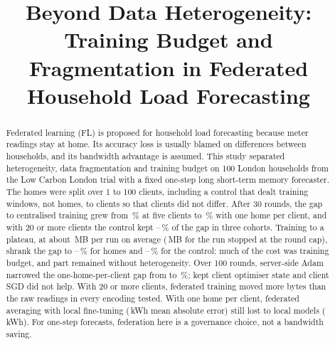 
\title{Beyond Data Heterogeneity: Training Budget and Fragmentation in Federated Household Load Forecasting}

\begin{abstract}
Federated learning (FL) is proposed for household load forecasting because meter readings stay at home. Its accuracy loss
is usually blamed on differences between households, and its bandwidth advantage is assumed. This study separated
heterogeneity, data fragmentation and training budget on 100 London households from the Low Carbon London trial with a
fixed one-step long short-term memory forecaster. The homes were split over 1 to 100 clients, including a control that
dealt training windows, not homes, to clients so that clients did not differ. After 30 rounds, the gap to centralised
training grew from \RvHomeKfiveGap{}\,\% at five clients to \RvHomeKhundredGap{}\,\% with one home per client, and with 20
or more clients the control kept \RvCoShareBigLo{}--\RvCoShareBigHi{}\,\% of the gap in three cohorts. Training to a
plateau, at about \RvPlhomesKhundredMBtotal{}\,MB per run on average (\RvPlhomesKhundredCapMB{}\,MB for the run stopped at the round cap), shrank the gap to \RvPlHomeGapLo{}--\RvPlHomeGapHi{}\,\% for
homes and \RvPlWinGapLo{}--\RvPlWinGapHi{}\,\% for the control: much of the cost was training budget, and part remained
without heterogeneity. Over 100 rounds, server-side Adam narrowed the one-home-per-client gap from
\RvOptAdamKonezerozeroGap{} to \RvOptFedAdamKonezerozeroGap{}\,\%; kept client optimiser state and client SGD did not
help. With 20 or more clients, federated training moved more bytes than the raw readings in every encoding tested.
With one home per client, federated averaging with local fine-tuning (\EonethreefedavghouseholdFT{}\,kWh mean absolute
error) still lost to local models (\EonelocalMAE{}\,kWh). For one-step forecasts, federation here is a governance
choice, not a bandwidth saving.
\end{abstract}


